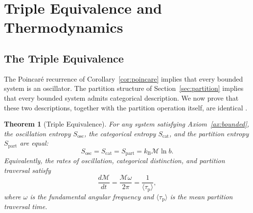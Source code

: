 \documentclass[11pt,twocolumn,a4paper]{article}
\theoremstyle{plain}
\newtheorem{theorem}{Theorem}[section]
\theoremstyle{definition}
\theoremstyle{remark}
\newcommand{\Sosc}{S_{\mathrm{osc}}}
\newcommand{\Scat}{S_{\mathrm{cat}}}
\newcommand{\Spart}{S_{\mathrm{part}}}
\newcommand{\kB}{k_{\mathrm{B}}}
\newcommand{\Depth}{\mathcal{M}}
\newcommand{\taup}{\tau_{\mathrm{p}}}
\begin{document}
\section{Triple Equivalence and Thermodynamics}
\label{sec:thermodynamics}

\subsection{The Triple Equivalence}

The Poincar\'e recurrence of Corollary~\ref{cor:poincare} implies that every bounded system is an oscillator. The partition structure of Section~\ref{sec:partition} implies that every bounded system admits categorical description. We now prove that these two descriptions, together with the partition operation itself, are identical \cite{sachikonye2026single, sachikonye2026atmospheric, sachikonye2026gas}.

\begin{theorem}[Triple Equivalence]
\label{thm:triple}
For any system satisfying Axiom~\ref{ax:bounded}, the oscillation entropy $\Sosc$, the categorical entropy $\Scat$, and the partition entropy $\Spart$ are equal:
\begin{equation}
\Sosc = \Scat = \Spart = \kB \Depth \ln b.
\label{eq:triple}
\end{equation}
Equivalently, the rates of oscillation, categorical distinction, and partition traversal satisfy
\begin{equation}
\frac{d\Depth}{dt} = \frac{\Depth \omega}{2\pi} = \frac{1}{\langle \taup \rangle},
\label{eq:triple_rate}
\end{equation}
where $\omega$ is the fundamental angular frequency and $\langle \taup \rangle$ is the mean partition traversal time.
\end{theorem}
\end{document}
